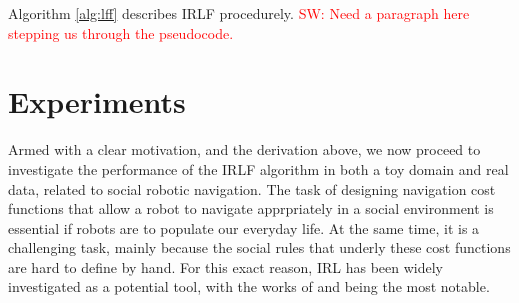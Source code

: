 \documentclass[letterpaper]{article}
\newcommand{\sw}[1]{\textcolor{red}{SW: #1}}
\newcommand{\sw}[1]{}
\begin{document}
Algorithm \ref{alg:lff} describes IRLF procedurely.  \sw{Need a paragraph here stepping us through the pseudocode.}



\section{Experiments}


Armed with a clear motivation, and the derivation above, we now proceed to investigate the performance of the IRLF algorithm in both a toy domain and real data, related to social robotic navigation. 
The task of designing navigation cost functions that allow a robot to navigate apprpriately in a social environment is essential if robots are to populate our everyday life. At the same time, it is a challenging task, mainly because the social rules that underly these cost functions are
hard to define by hand. For this exact reason, IRL has been widely investigated as a potential tool, with the works of \cite{henry2010learning} and \cite{vasquez2014inverse} being the most notable.
\end{document}
